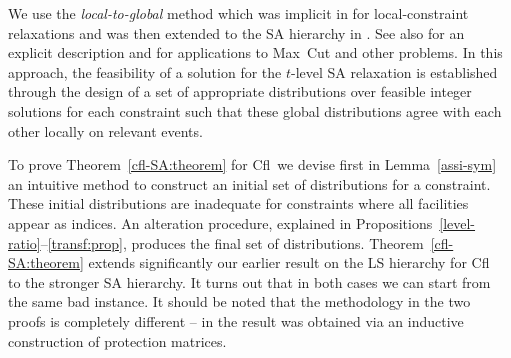 \documentclass[11pt]{article}
\newcommand{\cfl}{{\sc Cfl}}
\begin{document}
We use the \emph{local-to-global} method which was implicit in
\cite{AroraBLT06} for 
local-constraint
relaxations   and  was   then  extended   to  the   SA   hierarchy  in
\cite{FernandezdlVKM07}. 
See also \cite{GeorgiouMagen} for an explicit description and
\cite{CharikarMM09} for applications to Max~Cut and other
problems.  
In this approach, the feasibility of a solution for the $t$-level SA
relaxation is established through the design of a set of  appropriate
distributions over  feasible integer solutions for each constraint
such that these global distributions agree with each other locally on relevant
events.  
\begin{comment} -------- too technical 
In this approach, we interpret a linearized
product of a set $I$ of variables, namely $x_I$, as the probability of
occurrence of the event $\bigwedge_{j \in I}x_j=1,$ with respect to
a distribution over integer solutions.  
If there is an assignment $s^l$ of
values to the linearized variables
appearing at level $t$ of SA such that for each lifted constraint there is a
distribution over some  integer solutions and the values  of the $x_I$
variables    coincide   with    the   probability    of    the   event
$\bigwedge_{j \in I }x_j=1,$ with respect to  that distribution, then
 the projection $s$ of $s^l$ on the $(y,x)$ variables
 is  feasible  for  the  relaxation  obtained  at  level  $t$  of  the
 hierarchy. 
\end{comment} 
To prove Theorem~\ref{cfl-SA:theorem} for \cfl\ we 
devise first in Lemma~\ref{assi-sym} an intuitive method to construct an initial 
 set of distributions for a constraint. 
These  initial distributions are  inadequate for 
constraints where all facilities appear as indices. 
An alteration procedure,
explained in Propositions~\ref{level-ratio}--\ref{transf:prop}, 
 produces the final set of distributions. 
Theorem~\ref{cfl-SA:theorem} extends
significantly our earlier result on the  
LS hierarchy for \cfl\ \cite{KolliopoulosM13} to the stronger SA
hierarchy. It turns out that in both cases we can start from the same 
bad instance. 
It should be noted that the methodology in the two proofs is completely
different -- in \cite{KolliopoulosM13} the result was obtained via an 
inductive construction of  protection matrices. 
\end{document}
